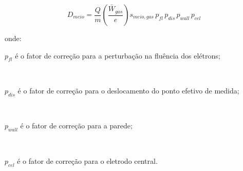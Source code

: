 \documentclass[11pt,a4paper]{article}
\newcounter{exemplo}
\begin{document}
				\begin{equation}
					D_{meio} = \frac{Q}{m}\left(\frac{\bar{W}_{gas}}{e}\right)s_{meio, gas}\, p_{fl}\, p_{dis}\, p_{wall}\, p_{cel}
				\end{equation}

			\noindent onde:

			\begin{exemplo}
				$p_{fl}$ é o fator de correção para a perturbação na fluência dos elétrons; 

				\

				$p_{dis}$ é o fator de correção para o deslocamento do ponto efetivo de medida;

				\

				$p_{wall}$ é o fator de correção para a parede;

				\

				$p_{cel}$ é o fator de correção para o eletrodo central.
			\end{exemplo}












  
\end{document}

